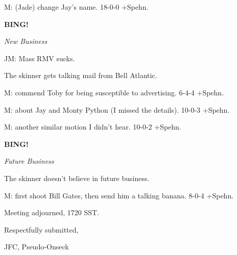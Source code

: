 \documentclass[12pt]{article}
\newcommand{\bing}{{\bf BING!} }
\newcommand{\goto}[1]{\bing \vskip 12pt \centerline{{\em{#1}}}}
\begin{document}
M: (Jade) change Jay's name. 18-0-0 +Spehn.

\goto{New Business}

JM: Mass RMV sucks.

The skinner gets talking mail from Bell Atlantic.

M: commend Toby for being susceptible to advertising. 6-4-4 +Spehn.

M: about Jay and Monty Python (I missed the details). 10-0-3 +Spehn.

M: another similar motion I didn't hear. 10-0-2 +Spehn.

\goto{Future Business}

The skinner doesn't believe in future business.

M: first shoot Bill Gates, then send him a talking banana. 8-0-4 +Spehn.

\vspace{12pt}

\noindent
Meeting adjourned, 1720 SST.

\vspace{18pt}

\centerline{Respectfully submitted,}
\centerline{JFC, Pseudo-Onseck}
\end{document}
